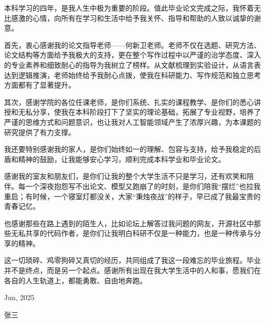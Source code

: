 \documentclass[UTF8,AutoFakeBold=1,AutoFakeSlant,zihao=-4]{HZAU}
\numberwithin{figure}{section}
\numberwithin{table}{section}
\numberwithin{equation}{section}
\begin{document}
\setlength{\parskip}{0em}
\renewcommand{\baselinestretch}{1.53}
\setlength{\parindent}{1.02cm}

 \clearpage

 \clearpage

 \clearpage

 \clearpage

 \clearpage

\nocite{*}



 \clearpage

\acknowledgement

本科学习的四年，是我人生中极为重要的阶段。值此毕业论文完成之际，我怀着无比感激的心情，向所有在学习和生活中给予我关怀、指导和帮助的人致以诚挚的谢意。

首先，衷心感谢我的论文指导老师——何新卫老师。老师不仅在选题、研究方法、论文结构等方面给予我极大的支持，更在整个写作过程中以严谨的治学态度、深入的专业素养和细致耐心的指导为我树立了榜样。从文献梳理到实验设计，从语言表达到逻辑推演，老师始终给予我耐心点拨，使我在科研能力、写作规范和独立思考方面都有了显著提升。

其次，感谢学院的各位任课老师，是你们系统、扎实的课程教学、是你们的悉心讲授和无私分享，使我在本科阶段打下了坚实的理论基础，拓展了专业视野，培养了严谨的思维方式和问题意识，也让我对人工智能领域产生了浓厚兴趣，为本课题的研究提供了有力支撑。

我还要特别感谢我的家人，是你们始终如一的理解、包容与支持，给予我稳定的后盾和精神的鼓励，让我能够安心学习，顺利完成本科学业和毕业论文。

感谢我的室友和朋友们，是你们让我的整个大学生活不只是学习，还有欢笑和陪伴。每一个深夜抱怨写不出论文、模型又跑崩了的时刻，是你们陪我“摆烂”也拉我重启；有时候，一个寝室灯都没关，大家“秉烛夜战”的样子，早已成了我最宝贵的青春记忆。

也感谢那些在路上遇到的陌生人，比如论坛上解答过我问题的网友，开源社区中那些无私共享的代码作者，是你们让我明白科研不仅是一种能力，也是一种传承与分享的精神。

这一切琐碎、鸡零狗碎又真切的经历，共同组成了我这一段难忘的毕业旅程。毕业并不是终点，而是另一个起点。感谢所有出现在我大学生活中的人和事，愿我们在各自的人生轨道上，都能勇敢、自由地奔跑。


\hfill Jun, 2025 

\hfill 张三
\end{document}

